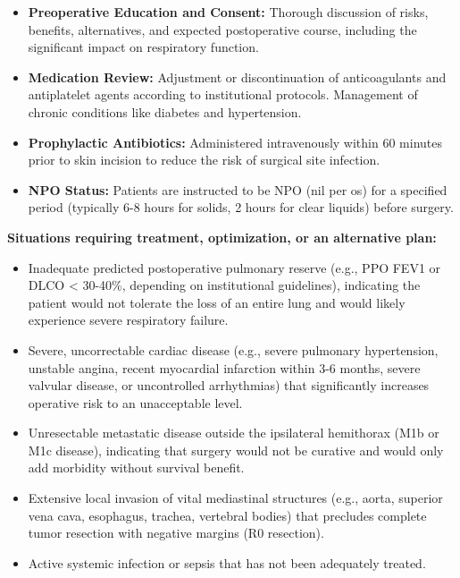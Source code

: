 \begin{itemize}
  \item \textbf{Preoperative Education and Consent:} Thorough discussion of risks, benefits, alternatives, and expected postoperative course, including the significant impact on respiratory function.
  
  \item \textbf{Medication Review:} Adjustment or discontinuation of anticoagulants and antiplatelet agents according to institutional protocols. Management of chronic conditions like diabetes and hypertension.
  
  \item \textbf{Prophylactic Antibiotics:} Administered intravenously within 60 minutes prior to skin incision to reduce the risk of surgical site infection.
  
  \item \textbf{NPO Status:} Patients are instructed to be NPO (nil per os) for a specified period (typically 6-8 hours for solids, 2 hours for clear liquids) before surgery.
\end{itemize}

\textbf{Situations requiring treatment, optimization, or an alternative plan:}

\begin{itemize}
  \item Inadequate predicted postoperative pulmonary reserve (e.g., PPO FEV1 or DLCO < 30-40\%, depending on institutional guidelines), indicating the patient would not tolerate the loss of an entire lung and would likely experience severe respiratory failure.
  
  \item Severe, uncorrectable cardiac disease (e.g., severe pulmonary hypertension, unstable angina, recent myocardial infarction within 3-6 months, severe valvular disease, or uncontrolled arrhythmias) that significantly increases operative risk to an unacceptable level.
  
  \item Unresectable metastatic disease outside the ipsilateral hemithorax (M1b or M1c disease), indicating that surgery would not be curative and would only add morbidity without survival benefit.
  
  \item Extensive local invasion of vital mediastinal structures (e.g., aorta, superior vena cava, esophagus, trachea, vertebral bodies) that precludes complete tumor resection with negative margins (R0 resection).
  
  \item Active systemic infection or sepsis that has not been adequately treated.
\end{itemize}

